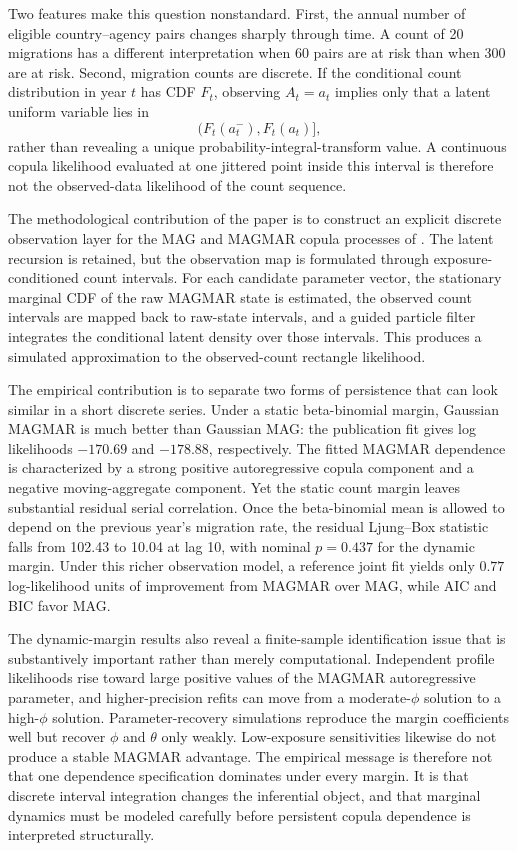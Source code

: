 \documentclass[11pt]{article}
\theoremstyle{definition}
\begin{document}
Two features make this question nonstandard. First, the annual number of eligible
country--agency pairs changes sharply through time. A count of 20 migrations has a
different interpretation when 60 pairs are at risk than when 300 are at risk.
Second, migration counts are discrete. If the conditional count distribution in
year $t$ has CDF $F_t$, observing $A_t=a_t$ implies only that a latent uniform
variable lies in
\[
\bigl(F_t(a_t^-),F_t(a_t)\bigr],
\]
rather than revealing a unique probability-integral-transform value. A continuous
copula likelihood evaluated at one jittered point inside this interval is therefore
not the observed-data likelihood of the count sequence.

The methodological contribution of the paper is to construct an explicit discrete
observation layer for the MAG and MAGMAR copula processes of
\citet{pappert2026mag}. The latent recursion is retained, but the observation map is
formulated through exposure-conditioned count intervals. For each candidate
parameter vector, the stationary marginal CDF of the raw MAGMAR state is estimated,
the observed count intervals are mapped back to raw-state intervals, and a guided
particle filter integrates the conditional latent density over those intervals.
This produces a simulated approximation to the observed-count rectangle likelihood.

The empirical contribution is to separate two forms of persistence that can look
similar in a short discrete series. Under a static beta-binomial margin, Gaussian
MAGMAR is much better than Gaussian MAG: the publication fit gives log likelihoods
$-170.69$ and $-178.88$, respectively. The fitted MAGMAR dependence is characterized
by a strong positive autoregressive copula component and a negative moving-aggregate
component. Yet the static count margin leaves substantial residual serial
correlation. Once the beta-binomial mean is allowed to depend on the previous year's
migration rate, the residual Ljung--Box statistic falls from 102.43 to 10.04 at lag
10, with nominal $p=0.437$ for the dynamic margin. Under this richer observation
model, a reference joint fit yields only $0.77$ log-likelihood units of improvement
from MAGMAR over MAG, while AIC and BIC favor MAG.

The dynamic-margin results also reveal a finite-sample identification issue that is
substantively important rather than merely computational. Independent profile
likelihoods rise toward large positive values of the MAGMAR autoregressive parameter,
and higher-precision refits can move from a moderate-$\phi$ solution to a
high-$\phi$ solution. Parameter-recovery simulations reproduce the margin
coefficients well but recover $\phi$ and $\theta$ only weakly. Low-exposure
sensitivities likewise do not produce a stable MAGMAR advantage. The empirical
message is therefore not that one dependence specification dominates under every
margin. It is that discrete interval integration changes the inferential object,
and that marginal dynamics must be modeled carefully before persistent copula
dependence is interpreted structurally.
\end{document}
